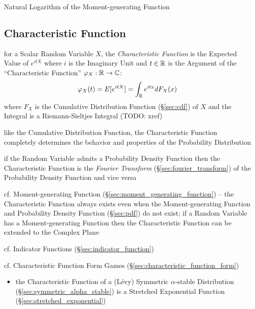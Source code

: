 Natural Logarithm of the Moment-generating Function



\subsection{Characteristic Function}\label{sec:characteristic_function}

for a Scalar Random Variable $X$, the \emph{Characteristic Function} is the
Expected Value of $e^{itX}$ where $i$ is the Imaginary Unit and $t \in \mathbb{R}$
is the Argument of the ``Characteristic Function''
$\varphi_X : \mathbb{R} \to \mathbb{C}$:
\[
  \varphi_X(t) = E[e^{itX}] = \int_{\mathbb{R}} e^{itx} dF_X(x)
\]
where $F_X$ is the Cumulative Distribution Function (\S\ref{sec:cdf}) of $X$ and
the Integral is a Riemann-Sieltjes Integral (TODO: xref)

like the Cumulative Distribution Function, the Characteristic Function
completely determines the behavior and properties of the Probability
Distribution

if the Random Variable admits a Probability Density Function then the
Characteristic Function is the \emph{Fourier Transform}
(\S\ref{sec:fourier_transform}) of the Probability Density Function and vice
versa

cf. Moment-generating Function (\S\ref{sec:moment_generating_function}) --
the Characteristic Function always exists even when the Moment-generating
Function and Probability Density Function (\S\ref{sec:pdf}) do not exist;
if a Random Variable has a Moment-generating Function then the Characteristic
Function can be extended to the Complex Plane

\fist cf. Indicator Functions (\S\ref{sec:indicator_function})

cf. Characteristic Function Form Games
(\S\ref{sec:characteristic_function_form})

\begin{itemize}
  \item the Characteristic Function of a (L\'evy) Symmetric $\alpha$-stable
    Distribution (\S\ref{sec:symmetric_alpha_stable}) is a Stretched Exponential
    Function (\S\ref{sec:stretched_exponential})
\end{itemize}




